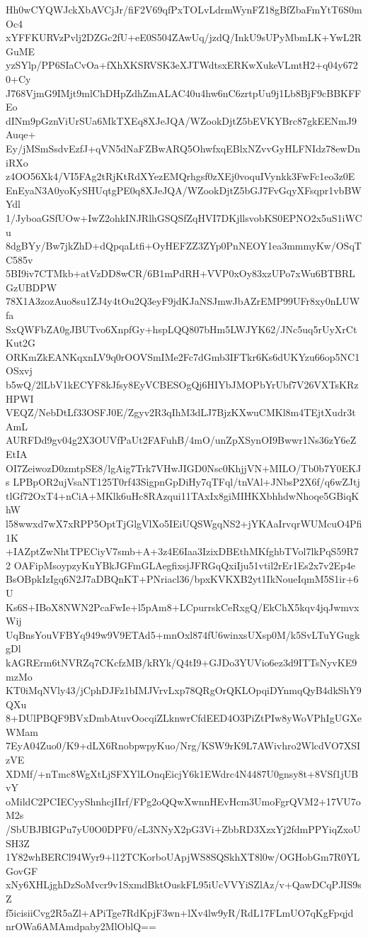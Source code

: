 Hh0wCYQWJckXbAVCjJr/fiF2V69qfPxTOLvLdrmWynFZ18gBfZbaFmYtT6S0mOc4
xYFFKURVzPvlj2DZGc2fU+eE0S504ZAwUq/jzdQ/InkU9sUPyMbmLK+YwL2RGuME
yzSYlp/PP6SIaCvOa+fXhXKSRVSK3eXJTWdtsxERKwXukeVLmtH2+q04y6720+Cy
J768VjmG9IMjt9mlChDHpZdhZmALAC40u4hw6nC6zrtpUu9j1Lb8BjF9cBBKFFEo
dINm9pGznViUrSUa6MkTXEq8XJeJQA/WZookDjtZ5bEVKYBrc87gkEENmJ9Auqe+
Ey/jMSmSsdvEzfJ+qVN5dNaFZBwARQ5OhwfxqEBlxNZvvGyHLFNIdz78ewDniRXo
z4OO56Xk4/VI5FAg2tRjKtRdXYezEMQrhgsf0zXEj0voquIVynkk3FwFc1eo3z0E
EnEyaN3A0yoKySHUqtgPE0q8XJeJQA/WZookDjtZ5bGJ7FvGqyXFsqpr1vbBWYdl
1/JyboaGSfUOw+IwZ2ohkINJRlhGSQSfZqHVI7DKjllsvobKS0EPNO2x5uS1iWCu
8dgBYy/Bw7jkZhD+dQpqaLtfi+OyHEFZZ3ZYp0PnNEOY1ea3mmmyKw/OSqTC585v
5BI9iv7CTMkb+atVzDD8wCR/6B1mPdRH+VVP0xOy83xzUPo7xWu6BTBRLGzUBDPW
78X1A3zozAuo8su1ZJ4y4tOu2Q3eyF9jdKJaNSJmwJbAZrEMP99UFr8xy0nLUWfa
SxQWFbZA0gJBUTvo6XnpfGy+hspLQQ807bHm5LWJYK62/JNc5uq5rUyXrCtKut2G
ORKmZkEANKqxnLV9q0rOOVSmIMe2Fc7dGmb3IFTkr6Ks6dUKYzu66op5NC1OSxvj
b5wQ/2lLbV1kECYF8kJfsy8EyVCBESOgQj6HIYbJMOPbYrUbf7V26VXTsKRzHPWI
VEQZ/NebDtLf33OSFJ0E/Zgyv2R3qIhM3dLJ7BjzKXwuCMKl8m4TEjtXudr3tAmL
AURFDd9gv04g2X3OUVfPaUt2FAFuhB/4mO/unZpXSynOI9Bwwr1Ns36zY6eZEtIA
OI7ZeiwozD0zmtpSE8/lgAig7Trk7VHwJIGD0Nsc0KhjjVN+MILO/Tb0b7Y0EKJs
LPBpOR2ujVsaNT125T0rf43SigpnGpDiHy7qTFql/tnVAl+JNbsP2X6f/q6wZJtj
tlGf72OxT4+nCiA+MKlk6uHc8RAzqui11TAxIx8giMIHKXbhhdwNhoqe5GBiqKhW
l58wwxd7wX7xRPP5OptTjGlgVlXo5IEiUQSWgqNS2+jYKAaIrvqrWUMcuO4Pfi1K
+IAZptZwNhtTPECiyV7smb+A+3z4E6Iaa3IzixDBEthMKfghbTVol7lkPqS59R72
OAFipMsoypzyKuYBkJGFmGLAegfixsjJFRGqQxiIju51vtil2rEr1Es2x7v2Ep4e
BsOBpkIzIgq6N2J7aDBQnKT+PNriacl36/bpxKVKXB2yt1IkNoueIqmM5S1ir+6U
Ks6S+IBoX8NWN2PcaFwIe+l5pAm8+LCpurrskCeRxgQ/EkChX5kqv4jqJwmvxWij
UqBnsYouVFBYq949w9V9ETAd5+mnOxl874fU6winxsUXsp0M/k5SvLTuYGugkgDl
kAGRErm6tNVRZq7CKcfzMB/kRYk/Q4tI9+GJDo3YUVio6ez3d9ITTsNyvKE9mzMo
KT0iMqNVly43/jCphDJFz1bIMJVrvLxp78QRgOrQKLOpqiDYnmqQyB4dkShY9QXu
8+DUlPBQF9BVxDmbAtuvOocqiZLknwrCfdEED4O3PiZtPIw8yWoVPhIgUGXeWMam
7EyA04Zuo0/K9+dLX6RnobpwpyKuo/Nrg/KSW9rK9L7AWivhro2WlcdVO7XSIzVE
XDMf/+nTmc8WgXtLjSFXYlLOnqEicjY6k1EWdrc4N4487U0gnsy8t+8VSf1jUBvY
oMildC2PCIECyyShnhcjIIrf/FPg2oQQwXwnnHEvHcm3UmoFgrQVM2+17VU7oM2s
/SbUBJBIGPu7yU0O0DPF0/eL3NNyX2pG3Vi+ZbbRD3XzxYj2fdmPPYiqZxoUSH3Z
1Y82whBERCl94Wyr9+l12TCKorboUApjWS8SQSkhXT8l0w/OGHobGm7R0YLGovGF
xNy6XHLjghDzSoMvcr9v1SxmdBktOuskFL95iUcVVYiSZlAz/v+QawDCqPJIS9sZ
f5icisiiCvg2R5aZl+APiTge7RdKpjF3wn+lXv4lw9yR/RdL17FLmUO7qKgFpqjd
nrOWa6AMAmdpaby2MlOblQ==
